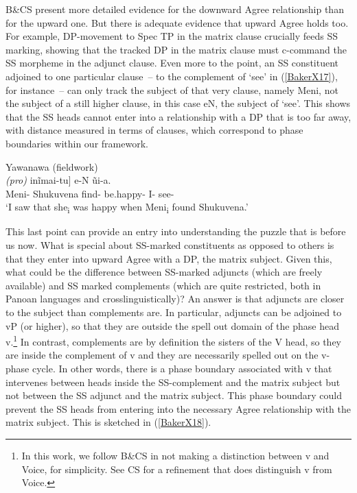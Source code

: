 \documentclass[output=paper]{langscibook}
\begin{document}
B\&CS present more detailed evidence for the downward Agree relationship than for the upward one. But there is adequate evidence that upward Agree holds too. For example, DP-movement to Spec TP in the matrix clause crucially feeds SS marking, showing that the tracked DP in the matrix clause must c-command the SS morpheme in the adjunct clause. Even more to the point, an SS constituent adjoined to one particular clause~– to the complement of `see’ in (\ref{BakerX17}), for instance~– can only track the subject of that very clause, namely Meni, not the subject of a still higher clause, in this case eN, the subject of `see’. This shows that the SS heads cannot enter into a relationship with a DP that is too far away, with distance measured in terms of clauses, which correspond to phase boundaries within our framework.

\begin{exe}
\ex Yawanawa (fieldwork) \label{BakerX17}\\
    \gll [[Meni-N Shukuvena vetxi-\textit{ashe}] \textit{(pro)} inĩmai-tu] e-N ũi-a.\\
        Meni- Shukuvena find- be.happy- I- see-\\
    \glt `I saw that she\textsubscript{i} was happy when Meni\textsubscript{i} found Shukuvena.'
\end{exe}

This last point can provide an entry into understanding the puzzle that is before us now. What is special about SS-marked constituents as opposed to others is that they enter into upward Agree with a DP, the matrix subject. Given this, what could be the difference between SS-marked adjuncts (which are freely available) and SS marked complements (which are quite restricted, both in Panoan languages and crosslinguistically)? An answer is that adjuncts are closer to the subject than complements are. In particular, adjuncts can be adjoined to vP (or higher), so that they are outside the spell out domain of the phase head v.\footnote{In this work, we follow B\&CS in not making a distinction between v and Voice, for simplicity. See CS for a refinement that does distinguish v from Voice.} In contrast, complements are by definition the sisters of the V head, so they are inside the complement of v and they are necessarily spelled out on the v-phase cycle. In other words, there is a phase boundary associated with v that intervenes between heads inside the SS-complement and the matrix subject but not between the SS adjunct and the matrix subject. This phase boundary could prevent the SS heads from entering into the necessary Agree relationship with the matrix subject. This is sketched in (\ref{BakerX18}).
\end{document}
